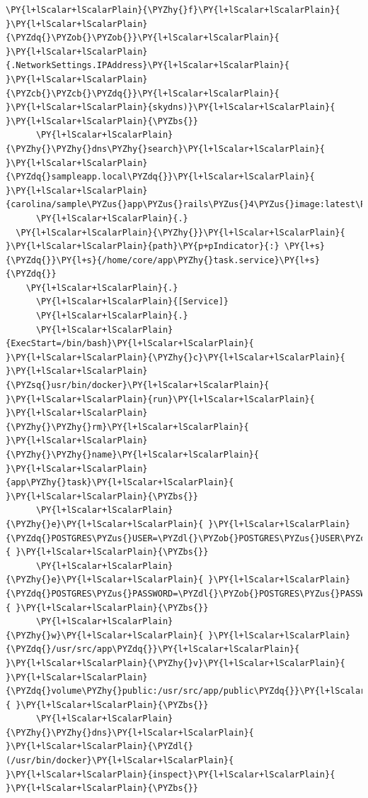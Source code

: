 \begin{codelisting}
\begin{Verbatim}[fontsize=\relsize{-2.5},fontseries=b,commandchars=\\\{\}]
      \PY{l+lScalar+lScalarPlain}{\PYZhy{}f}\PY{l+lScalar+lScalarPlain}{ }\PY{l+lScalar+lScalarPlain}{\PYZdq{}\PYZob{}\PYZob{}}\PY{l+lScalar+lScalarPlain}{ }\PY{l+lScalar+lScalarPlain}{.NetworkSettings.IPAddress}\PY{l+lScalar+lScalarPlain}{ }\PY{l+lScalar+lScalarPlain}{\PYZcb{}\PYZcb{}\PYZdq{}}\PY{l+lScalar+lScalarPlain}{ }\PY{l+lScalar+lScalarPlain}{skydns)}\PY{l+lScalar+lScalarPlain}{ }\PY{l+lScalar+lScalarPlain}{\PYZbs{}}
      \PY{l+lScalar+lScalarPlain}{\PYZhy{}\PYZhy{}dns\PYZhy{}search}\PY{l+lScalar+lScalarPlain}{ }\PY{l+lScalar+lScalarPlain}{\PYZdq{}sampleapp.local\PYZdq{}}\PY{l+lScalar+lScalarPlain}{ }\PY{l+lScalar+lScalarPlain}{carolina/sample\PYZus{}app\PYZus{}rails\PYZus{}4\PYZus{}image:latest\PYZsq{}}
      \PY{l+lScalar+lScalarPlain}{.}
  \PY{l+lScalar+lScalarPlain}{\PYZhy{}}\PY{l+lScalar+lScalarPlain}{ }\PY{l+lScalar+lScalarPlain}{path}\PY{p+pIndicator}{:} \PY{l+s}{\PYZdq{}}\PY{l+s}{/home/core/app\PYZhy{}task.service}\PY{l+s}{\PYZdq{}}
    \PY{l+lScalar+lScalarPlain}{.}
      \PY{l+lScalar+lScalarPlain}{[Service]}
      \PY{l+lScalar+lScalarPlain}{.}
      \PY{l+lScalar+lScalarPlain}{ExecStart=/bin/bash}\PY{l+lScalar+lScalarPlain}{ }\PY{l+lScalar+lScalarPlain}{\PYZhy{}c}\PY{l+lScalar+lScalarPlain}{ }\PY{l+lScalar+lScalarPlain}{\PYZsq{}usr/bin/docker}\PY{l+lScalar+lScalarPlain}{ }\PY{l+lScalar+lScalarPlain}{run}\PY{l+lScalar+lScalarPlain}{ }\PY{l+lScalar+lScalarPlain}{\PYZhy{}\PYZhy{}rm}\PY{l+lScalar+lScalarPlain}{ }\PY{l+lScalar+lScalarPlain}{\PYZhy{}\PYZhy{}name}\PY{l+lScalar+lScalarPlain}{ }\PY{l+lScalar+lScalarPlain}{app\PYZhy{}task}\PY{l+lScalar+lScalarPlain}{ }\PY{l+lScalar+lScalarPlain}{\PYZbs{}}
      \PY{l+lScalar+lScalarPlain}{\PYZhy{}e}\PY{l+lScalar+lScalarPlain}{ }\PY{l+lScalar+lScalarPlain}{\PYZdq{}POSTGRES\PYZus{}USER=\PYZdl{}\PYZob{}POSTGRES\PYZus{}USER\PYZcb{}\PYZdq{}}\PY{l+lScalar+lScalarPlain}{ }\PY{l+lScalar+lScalarPlain}{\PYZbs{}}
      \PY{l+lScalar+lScalarPlain}{\PYZhy{}e}\PY{l+lScalar+lScalarPlain}{ }\PY{l+lScalar+lScalarPlain}{\PYZdq{}POSTGRES\PYZus{}PASSWORD=\PYZdl{}\PYZob{}POSTGRES\PYZus{}PASSWORD\PYZcb{}\PYZdq{}}\PY{l+lScalar+lScalarPlain}{ }\PY{l+lScalar+lScalarPlain}{\PYZbs{}}
      \PY{l+lScalar+lScalarPlain}{\PYZhy{}w}\PY{l+lScalar+lScalarPlain}{ }\PY{l+lScalar+lScalarPlain}{\PYZdq{}/usr/src/app\PYZdq{}}\PY{l+lScalar+lScalarPlain}{ }\PY{l+lScalar+lScalarPlain}{\PYZhy{}v}\PY{l+lScalar+lScalarPlain}{ }\PY{l+lScalar+lScalarPlain}{\PYZdq{}volume\PYZhy{}public:/usr/src/app/public\PYZdq{}}\PY{l+lScalar+lScalarPlain}{ }\PY{l+lScalar+lScalarPlain}{\PYZbs{}}
      \PY{l+lScalar+lScalarPlain}{\PYZhy{}\PYZhy{}dns}\PY{l+lScalar+lScalarPlain}{ }\PY{l+lScalar+lScalarPlain}{\PYZdl{}(/usr/bin/docker}\PY{l+lScalar+lScalarPlain}{ }\PY{l+lScalar+lScalarPlain}{inspect}\PY{l+lScalar+lScalarPlain}{ }\PY{l+lScalar+lScalarPlain}{\PYZbs{}}

\end{Verbatim}
\end{codelisting}
